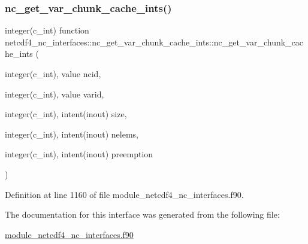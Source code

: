 \subsubsection{\texorpdfstring{nc\+\_\+get\+\_\+var\+\_\+chunk\+\_\+cache\+\_\+ints()}{nc\_get\_var\_chunk\_cache\_ints()}}
{\footnotesize\ttfamily integer(c\+\_\+int) function netcdf4\+\_\+nc\+\_\+interfaces\+::nc\+\_\+get\+\_\+var\+\_\+chunk\+\_\+cache\+\_\+ints\+::nc\+\_\+get\+\_\+var\+\_\+chunk\+\_\+cache\+\_\+ints (\begin{DoxyParamCaption}\item[{integer(c\+\_\+int), value}]{ncid,  }\item[{integer(c\+\_\+int), value}]{varid,  }\item[{integer(c\+\_\+int), intent(inout)}]{size,  }\item[{integer(c\+\_\+int), intent(inout)}]{nelems,  }\item[{integer(c\+\_\+int), intent(inout)}]{preemption }\end{DoxyParamCaption})}



Definition at line 1160 of file module\+\_\+netcdf4\+\_\+nc\+\_\+interfaces.\+f90.



The documentation for this interface was generated from the following file\+:\begin{DoxyCompactItemize}
\item 
\hyperlink{module__netcdf4__nc__interfaces_8f90}{module\+\_\+netcdf4\+\_\+nc\+\_\+interfaces.\+f90}\end{DoxyCompactItemize}
